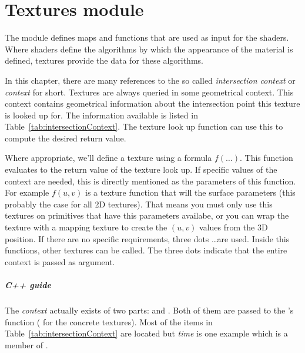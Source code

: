 % 

\chapter{Textures module}

The  module defines maps and functions that are used as input for the shaders.  Where shaders define the algorithms by which the appearance of the material is defined, textures provide the data for these algorithms.

In this chapter, there are many references to the so called \emph{intersection context} or \emph{context} for short.  Textures are always queried in some geometrical context.  This context contains geometrical information about the intersection point this texture is looked up for.  The information available is listed in Table~\ref{tab:intersectionContext}.  The texture look up function can use this to compute the desired return value. 

Where appropriate, we'll define a texture using a formula $f\left(\ldots\right)$.  This function evaluates to the return value of the texture look up.  If specific values of the context are needed, this is directly mentioned as the parameters of this function.  For example $f\left(u, v\right)$ is a texture function that will the surface parameters (this probably the case for all 2D textures).  That means you must only use this textures on primitives that have this parameters availabe, or you can wrap the texture with a mapping texture to create the $\left(u, v\right)$ values from the 3D position.  If there are no specific requirements, three dots \ldots are used.  Inside this functions, other textures can be called.  The three dots indicate that the entire context is passed as argument.

\paragraph{C++ guide}

The \emph{context} actually exists of two parts:  and .  Both of them are passed to the 's  function ( for the concrete textures).  Most of the items in Table~\ref{tab:intersectionContext} are located  but \emph{time} is one example which is a member of .


